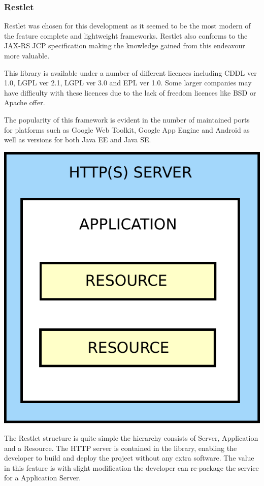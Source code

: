 \documentclass[pdftex,11pt,a4paper]{article}
\begin{document}
\subsubsection{Restlet}
Restlet was chosen for this development as it seemed to be the most modern of the feature complete and lightweight frameworks. Restlet also conforms to the JAX-RS JCP specification\cite{website:jax-rs_jcp} making the knowledge gained from this endeavour more valuable.

This library is available under a number of different licences including CDDL ver 1.0, LGPL ver 2.1, LGPL ver 3.0 and EPL ver 1.0. Some larger companies may have difficulty with these licences due to the lack of freedom licences like BSD or Apache offer.

The popularity of this framework is evident in the number of maintained ports for platforms such as Google Web Toolkit, Google App Engine and Android as well as versions for both Java EE and Java SE.

\begin{center}
	\includegraphics[scale=0.5]{images/restlet_structure.pdf}
\end{center}

The Restlet structure is quite simple the hierarchy consists of Server, Application and a Resource. The HTTP server is contained in the library, enabling the developer to build and deploy the project without any extra software.  The value in this feature is with slight modification the developer can re-package the service for a Application Server.
\end{document}
